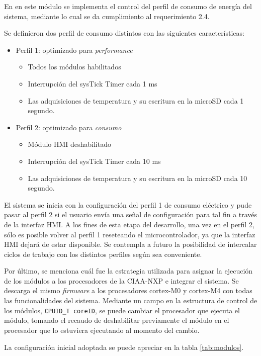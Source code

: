 En en este módulo se implementa el control del perfil de consumo de energía del sistema, mediante lo cual se da cumplimiento al requerimiento  2.4.

Se definieron dos perfil de consumo distintos con las siguientes características:

\begin{itemize}
	\item Perfil 1: optimizado para \textit{performance}
	\begin{itemize}
		\item Todos los módulos habilitados
		\item Interrupción del sysTick Timer cada 1 ms
		\item Las adquisiciones de temperatura y su escritura en la microSD cada 1 segundo.
	\end{itemize}
	\item Perfil 2: optimizado para \textit{consumo}
	\begin{itemize}
		\item Módulo HMI deshabilitado
		\item Interrupción del sysTick Timer cada 10 ms
		\item Las adquisiciones de temperatura y su escritura en la microSD cada 10 segundo.
	\end{itemize}
\end{itemize}

El sistema se inicia con la configuración del perfil 1 de consumo eléctrico y pude pasar al perfil 2 si el usuario envía una señal de configuración para tal fin a través de la interfaz HMI. A los fines de esta etapa del desarrollo, una vez en el perfil 2, sólo es posible volver al perfil 1 reseteando el microcontrolador, ya que la interfaz HMI dejará de estar disponible.  Se contempla a futuro la posibilidad de intercalar ciclos de trabajo con los distintos perfiles según sea conveniente.

Por último, se menciona cuál fue la estrategia utilizada para asignar la ejecución de los módulos a los procesadores de la CIAA-NXP e integrar el sistema.  Se descarga el mismo \textit{firmware} a los  procesadores cortex-M0 y cortex-M4 con todas las funcionalidades del sistema.  Mediante un campo en la estructura de control de los módulos, \texttt{CPUID\_T coreID}, se puede cambiar el procesador que ejecuta el módulo, tomando el recaudo de deshabilitar previamente el módulo en el procesador que lo estuviera ejecutando al momento del cambio.

La configuración inicial adoptada se puede apreciar en la tabla \ref{tab:modulos}.

